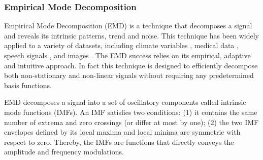 % 
% 


\subsubsection{Empirical Mode Decomposition}
Empirical Mode Decomposition (EMD) \cite{huang:emd1998} is a technique that decomposes a signal and reveals its intrinsic patterns, trend and noise.
This technique has been widely applied to a variety of datasets, including climate variables \cite{barnhart:climateEMD2011,lee:climateEMD2011}, medical data \cite{lima:bioMed2006,echeverria:bioMed2001,blanco:bioMed2008}, speech signals \cite{huang:signalProc2006,hasan:ieeeletter2009}, and images \cite{nunes:image2003,nunes:vision2005}.
The EMD success relies on its empirical, adaptive and intuitive approach.
In fact this technique is designed to efficiently decompose both non-stationary and non-linear signals without requiring any predetermined basis functions.  

EMD decomposes a signal into a set of oscillatory components called intrinsic mode functions (IMFs). 
An IMF satisfies two conditions: (1) it contains the same number of extrema and zero crossings (or differ at most by one); (2) the two IMF envelopes defined by its local maxima and local minima are symmetric with respect to zero. 
Thereby, the IMFs are functions that directly conveys the amplitude and frequency modulations.

